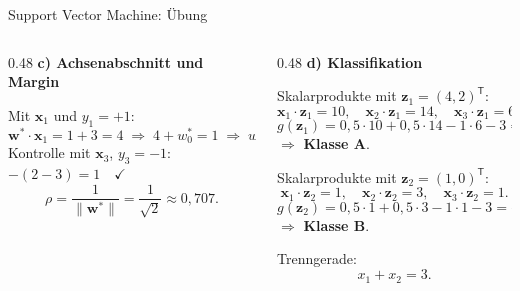 {\begin{frame}{Support Vector Machine: Übung}
{\begin{columns}[T,onlytextwidth]
\begin{column}{0.48\textwidth}
\textbf{c) Achsenabschnitt und Margin}

Mit $\mathbf{x}_1$ und $y_1 = +1$:
\[
\mathbf{w}^{*}\!\cdot\mathbf{x}_1 = 1 + 3 = 4
\;\Rightarrow\; 4 + w_0^{*} = 1
\;\Rightarrow\; w_0^{*} = -3.
\]
Kontrolle mit $\mathbf{x}_3$, $y_3 = -1$:
$-(2 - 3) = 1 \quad\checkmark$
\[
\rho = \frac{1}{\lVert\mathbf{w}^{*}\rVert} = \frac{1}{\sqrt{2}} \approx 0{,}707.
\]
\end{column}

\begin{column}{0.48\textwidth}
\footnotesize
\textbf{d) Klassifikation}

Skalarprodukte mit $\mathbf{z}_1 = (4,2)^{\mathsf{T}}$:
\[
\mathbf{x}_1\!\cdot\mathbf{z}_1 = 10,\quad
\mathbf{x}_2\!\cdot\mathbf{z}_1 = 14,\quad
\mathbf{x}_3\!\cdot\mathbf{z}_1 = 6.
\]
\[
g(\mathbf{z}_1) = 0{,}5\cdot 10 + 0{,}5\cdot 14 - 1\cdot 6 - 3 = 3 > 0
\]
$\Rightarrow$ \textbf{Klasse A}.

\vspace{0.4em}
Skalarprodukte mit $\mathbf{z}_2 = (1,0)^{\mathsf{T}}$:
\[
\mathbf{x}_1\!\cdot\mathbf{z}_2 = 1,\quad
\mathbf{x}_2\!\cdot\mathbf{z}_2 = 3,\quad
\mathbf{x}_3\!\cdot\mathbf{z}_2 = 1.
\]
\[
g(\mathbf{z}_2) = 0{,}5\cdot 1 + 0{,}5\cdot 3 - 1\cdot 1 - 3 = -2 < 0
\]
$\Rightarrow$ \textbf{Klasse B}.

\vspace{0.4em}
Trenngerade:
\[
\boxed{x_1 + x_2 = 3.}
\]
\end{column}

\end{columns}
}

\end{frame}}
